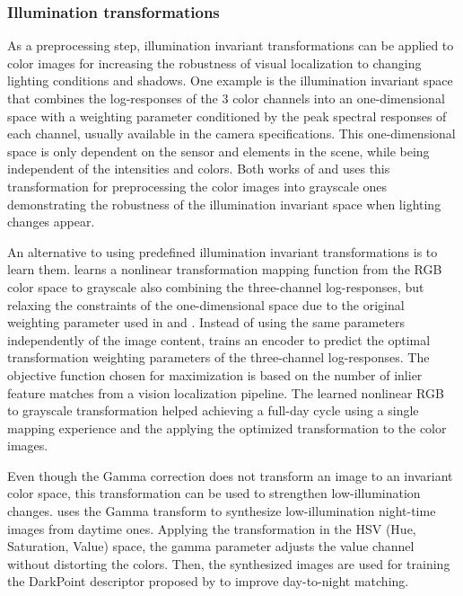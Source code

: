 \subsubsection{Illumination transformations}
\label{sec:discussion:appearance:illumination}

As a preprocessing step, illumination invariant transformations can be applied to color images for increasing the robustness of visual localization to changing lighting conditions and shadows.
One example is the illumination invariant space that combines the log-responses of the 3 color channels into an one-dimensional space with a weighting parameter conditioned by the peak spectral responses of each channel, usually available in the camera specifications. This one-dimensional space is only dependent on the sensor and elements in the scene, while being independent of the intensities and colors.
Both works of \cite{arroyo-et-al:2018:7} and \cite{yang-et-al:2021:12054} uses this transformation for preprocessing the color images into grayscale ones demonstrating the robustness of the illumination invariant space when lighting changes appear.

An alternative to using predefined illumination invariant transformations is to learn them.
\cite{clement-et-al:2020:2967659} learns a nonlinear transformation mapping function from the RGB color space to grayscale also combining the three-channel log-responses, but relaxing the constraints of the one-dimensional space due to the original weighting parameter used in \cite{arroyo-et-al:2018:7} and \cite{yang-et-al:2021:12054}. Instead of using the same parameters independently of the image content, \cite{clement-et-al:2020:2967659} trains an encoder to predict the optimal transformation weighting parameters of the three-channel log-responses.
The objective function chosen for maximization is based on the number of inlier feature matches from a vision localization pipeline.
The learned nonlinear RGB to grayscale transformation helped achieving a full-day cycle using a single mapping experience and the applying the optimized transformation to the color images.

Even though the Gamma correction does not transform an image to an invariant color space, this transformation can be used to strengthen low-illumination changes. \cite{sun-et-al:2021:9635886} uses the Gamma transform to synthesize low-illumination night-time images from daytime ones. Applying the transformation in the HSV (Hue, Saturation, Value) space, the gamma parameter adjusts the value channel without distorting the colors. Then, the synthesized images are used for training the DarkPoint descriptor proposed by \cite{sun-et-al:2021:9635886} to improve day-to-night matching.




